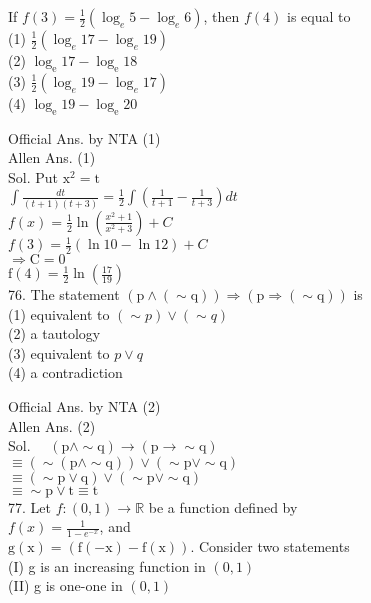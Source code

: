 \documentclass[10pt]{article}
\begin{document}
If \(f(3)=\frac{1}{2}\left(\log _{e} 5-\log _{e} 6\right)\), then \(f(4)\) is equal to\\
(1) \(\frac{1}{2}\left(\log _{e} 17-\log _{e} 19\right)\)\\
(2) \(\log _{\mathrm{e}} 17-\log _{\mathrm{e}} 18\)\\
(3) \(\frac{1}{2}\left(\log _{e} 19-\log _{e} 17\right)\)\\
(4) \(\log _{\mathrm{e}} 19-\log _{\mathrm{e}} 20\)

Official Ans. by NTA (1)\\
Allen Ans. (1)\\
Sol. Put \(\mathrm{x}^{2}=\mathrm{t}\)\\
\(\int \frac{d t}{(t+1)(t+3)}=\frac{1}{2} \int\left(\frac{1}{t+1}-\frac{1}{t+3}\right) d t\)\\
\(f(x)=\frac{1}{2} \ln \left(\frac{x^{2}+1}{x^{2}+3}\right)+C\)\\
\(f(3)=\frac{1}{2}(\ln 10-\ln 12)+C\)\\
\(\Rightarrow \mathrm{C}=0\)\\
\(\mathrm{f}(4)=\frac{1}{2} \ln \left(\frac{17}{19}\right)\)\\
76. The statement \((\mathrm{p} \wedge(\sim \mathrm{q})) \Rightarrow(\mathrm{p} \Rightarrow(\sim \mathrm{q}))\) is\\
(1) equivalent to \((\sim p) \vee(\sim q)\)\\
(2) a tautology\\
(3) equivalent to \(p \vee q\)\\
(4) a contradiction

Official Ans. by NTA (2)\\
Allen Ans. (2)\\
Sol. \(\quad(\mathrm{p} \wedge \sim \mathrm{q}) \rightarrow(\mathrm{p} \rightarrow \sim \mathrm{q})\)\\
\(\equiv(\sim(\mathrm{p} \wedge \sim \mathrm{q})) \vee(\sim \mathrm{p} \vee \sim \mathrm{q})\)\\
\(\equiv(\sim \mathrm{p} \vee \mathrm{q}) \vee(\sim \mathrm{p} \vee \sim \mathrm{q})\)\\
\(\equiv \sim \mathrm{p} \vee \mathrm{t} \equiv \mathrm{t}\)\\
77. Let \(f:(0,1) \rightarrow \mathbb{R}\) be a function defined by\\
\(f(x)=\frac{1}{1-e^{-x}}\), and\\
\(\mathrm{g}(\mathrm{x})=(\mathrm{f}(-\mathrm{x})-\mathrm{f}(\mathrm{x}))\). Consider two statements\\
(I) g is an increasing function in \((0,1)\)\\
(II) g is one-one in \((0,1)\)
\end{document}
